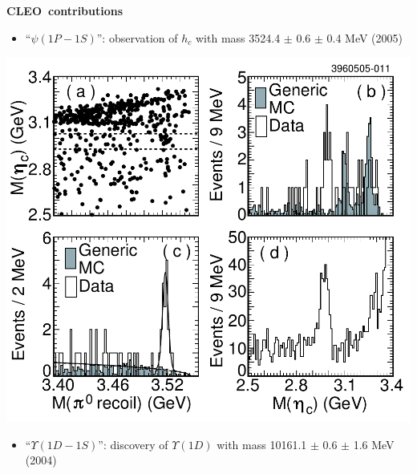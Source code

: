 \documentclass[landscape]{article}
\newenvironment{slide}[1][ ]{\mbox{\bf \boldmath #1 } \vfill}{\vfill \vspace{-1.5 cm} \mbox{ } \pagebreak}
\begin{document}
\begin{slide}[CLEO contributions]

\vspace{-1.5 cm}
\begin{minipage}{0.6\linewidth}
  \begin{itemize}

    \item ``$\psi(1P-1S)$'': observation of $h_c$ with mass
    3524.4 $\pm$ 0.6 $\pm$ 0.4 MeV (2005)

  \end{itemize}
\end{minipage} \hfill \begin{minipage}{0.38\linewidth}
  \includegraphics[width=\linewidth, trim=0 0 8.5cm 7cm, clip=true]{discovery_hc}
\end{minipage}

\begin{minipage}{0.6\linewidth}
  \begin{itemize}

    \item ``$\Upsilon(1D-1S)$'': discovery of $\Upsilon(1D)$ with mass
    10161.1 $\pm$ 0.6 $\pm$ 1.6 MeV (2004)


\end{itemize}
\end{minipage}
\end{slide}
\end{document}
